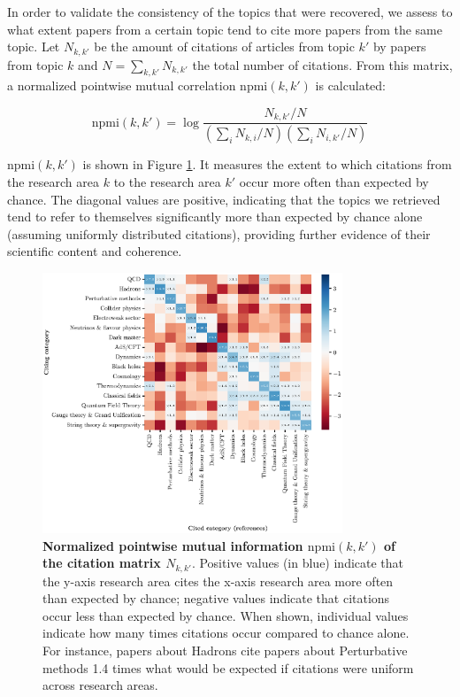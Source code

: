 \documentclass{article}
\begin{document}
In order to validate the consistency of the topics that were recovered, we assess to what extent papers from a certain topic tend to cite more papers from the same topic. Let $N_{k,k'}$ be the amount of citations of articles from topic $k'$ by papers from topic $k$ and $N=\sum_{k,k'}N_{k,k'}$ the total number of citations. From this matrix, a normalized pointwise mutual correlation $\mathrm{npmi}(k,k')$ is calculated:

\begin{equation}
    \mathrm{npmi}(k,k') = \log {\dfrac{N_{k,k'}/N}{(\sum_{i} N_{k,i}/N)(\sum_{i} N_{i,k'}/N)}}
\end{equation}

$\mathrm{npmi}(k,k')$ is shown in Figure \ref{fig:topic_citation_matrix}. It measures the extent to which citations from the research area $k$ to the research area $k'$ occur more often than expected by chance. The diagonal values are positive, indicating that the topics we retrieved tend to refer to themselves significantly more than expected by chance alone (assuming uniformly distributed citations), providing further evidence of their scientific content and coherence.

\begin{figure}[H]
    \centering
    \includegraphics[width=0.8\textwidth]{plots/topic_citation_matrix.eps}
    \caption{\textbf{Normalized pointwise mutual information $\mathrm{npmi}(k,k')$ of the citation matrix $N_{k,k'}$}. Positive values (in blue) indicate that the y-axis research area cites the x-axis research area more often than expected by chance; negative values indicate that citations occur less than expected by chance. When shown, individual values indicate how many times citations occur compared to chance alone. For instance, papers about Hadrons cite papers about Perturbative methods 1.4 times what would be expected if citations were uniform across research areas.}
    \label{fig:topic_citation_matrix}
\end{figure}
\end{document}
